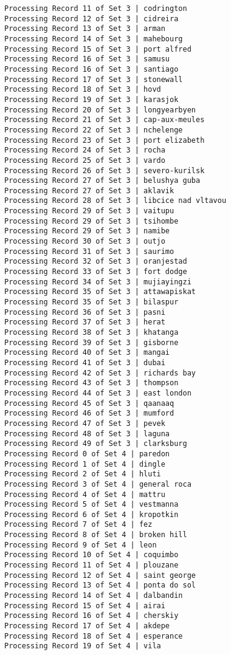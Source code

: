 \documentclass[11pt]{article}
\begin{document}
\begin{Verbatim}[commandchars=\\\{\}]
Processing Record 11 of Set 3 | codrington
Processing Record 12 of Set 3 | cidreira
Processing Record 13 of Set 3 | arman
Processing Record 14 of Set 3 | mahebourg
Processing Record 15 of Set 3 | port alfred
Processing Record 16 of Set 3 | samusu
Processing Record 16 of Set 3 | santiago
Processing Record 17 of Set 3 | stonewall
Processing Record 18 of Set 3 | hovd
Processing Record 19 of Set 3 | karasjok
Processing Record 20 of Set 3 | longyearbyen
Processing Record 21 of Set 3 | cap-aux-meules
Processing Record 22 of Set 3 | nchelenge
Processing Record 23 of Set 3 | port elizabeth
Processing Record 24 of Set 3 | rocha
Processing Record 25 of Set 3 | vardo
Processing Record 26 of Set 3 | severo-kurilsk
Processing Record 27 of Set 3 | belushya guba
Processing Record 27 of Set 3 | aklavik
Processing Record 28 of Set 3 | libcice nad vltavou
Processing Record 29 of Set 3 | vaitupu
Processing Record 29 of Set 3 | tsihombe
Processing Record 29 of Set 3 | namibe
Processing Record 30 of Set 3 | outjo
Processing Record 31 of Set 3 | saurimo
Processing Record 32 of Set 3 | oranjestad
Processing Record 33 of Set 3 | fort dodge
Processing Record 34 of Set 3 | mujiayingzi
Processing Record 35 of Set 3 | attawapiskat
Processing Record 35 of Set 3 | bilaspur
Processing Record 36 of Set 3 | pasni
Processing Record 37 of Set 3 | herat
Processing Record 38 of Set 3 | khatanga
Processing Record 39 of Set 3 | gisborne
Processing Record 40 of Set 3 | mangai
Processing Record 41 of Set 3 | dubai
Processing Record 42 of Set 3 | richards bay
Processing Record 43 of Set 3 | thompson
Processing Record 44 of Set 3 | east london
Processing Record 45 of Set 3 | qaanaaq
Processing Record 46 of Set 3 | mumford
Processing Record 47 of Set 3 | pevek
Processing Record 48 of Set 3 | laguna
Processing Record 49 of Set 3 | clarksburg
Processing Record 0 of Set 4 | paredon
Processing Record 1 of Set 4 | dingle
Processing Record 2 of Set 4 | hluti
Processing Record 3 of Set 4 | general roca
Processing Record 4 of Set 4 | mattru
Processing Record 5 of Set 4 | vestmanna
Processing Record 6 of Set 4 | kropotkin
Processing Record 7 of Set 4 | fez
Processing Record 8 of Set 4 | broken hill
Processing Record 9 of Set 4 | leon
Processing Record 10 of Set 4 | coquimbo
Processing Record 11 of Set 4 | plouzane
Processing Record 12 of Set 4 | saint george
Processing Record 13 of Set 4 | ponta do sol
Processing Record 14 of Set 4 | dalbandin
Processing Record 15 of Set 4 | airai
Processing Record 16 of Set 4 | cherskiy
Processing Record 17 of Set 4 | akdepe
Processing Record 18 of Set 4 | esperance
Processing Record 19 of Set 4 | vila

\end{Verbatim}
\end{document}
